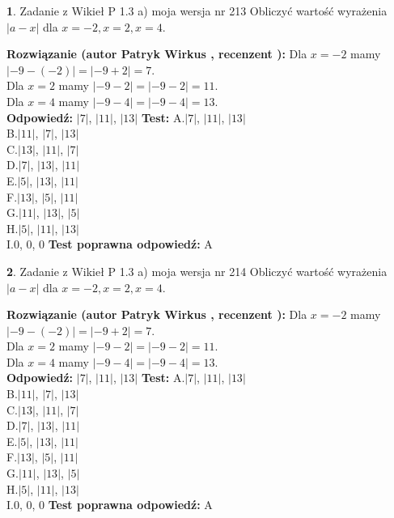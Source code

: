 \documentclass[12pt, a4paper]{article}
\theoremstyle{definition} %
\newtheorem{zad}{}
\newcommand{\zadStart}[1]{\begin{zad}#1\newline}
\newcommand{\zadStop}{\end{zad}}
\newcommand{\rozwStart}[2]{\noindent \textbf{Rozwiązanie (autor #1 , recenzent #2): }\newline}
\newcommand{\rozwStop}{\newline}
\newcommand{\odpStart}{\noindent \textbf{Odpowiedź:}\newline}
\newcommand{\odpStop}{\newline}
\newcommand{\testStart}{\noindent \textbf{Test:}\newline}
\newcommand{\testStop}{\newline}
\newcommand{\kluczStart}{\noindent \textbf{Test poprawna odpowiedź:}\newline}
\newcommand{\kluczStop}{\newline}
\begin{document}
\zadStart{Zadanie z Wikieł P 1.3 a) moja wersja nr 213}
Obliczyć wartość wyrażenia $|a - x|$ dla $x=-2,x=2,x=4$.
\zadStop
\rozwStart{Patryk Wirkus}{}
Dla $x = -2$ mamy $|-9 - (-2)| = |-9 + 2| = 7$.\\
Dla $x = 2$ mamy $|-9 - 2| = |-9 - 2| = 11$.\\
Dla $x = 4$ mamy $|-9 - 4| = |-9 - 4| = 13$.\\
\rozwStop
\odpStart
$|7|$, $|11|$, $|13|$
\odpStop
\testStart
A.$|7|$, $|11|$, $|13|$\\
B.$|11|$, $|7|$, $|13|$\\
C.$|13|$, $|11|$, $|7|$\\
D.$|7|$, $|13|$, $|11|$\\
E.$|5|$, $|13|$, $|11|$\\
F.$|13|$, $|5|$, $|11|$\\
G.$|11|$, $|13|$, $|5|$\\
H.$|5|$, $|11|$, $|13|$\\
I.$0$, $0$, $0$
\testStop
\kluczStart
A
\kluczStop



\zadStart{Zadanie z Wikieł P 1.3 a) moja wersja nr 214}
Obliczyć wartość wyrażenia $|a - x|$ dla $x=-2,x=2,x=4$.
\zadStop
\rozwStart{Patryk Wirkus}{}
Dla $x = -2$ mamy $|-9 - (-2)| = |-9 + 2| = 7$.\\
Dla $x = 2$ mamy $|-9 - 2| = |-9 - 2| = 11$.\\
Dla $x = 4$ mamy $|-9 - 4| = |-9 - 4| = 13$.\\
\rozwStop
\odpStart
$|7|$, $|11|$, $|13|$
\odpStop
\testStart
A.$|7|$, $|11|$, $|13|$\\
B.$|11|$, $|7|$, $|13|$\\
C.$|13|$, $|11|$, $|7|$\\
D.$|7|$, $|13|$, $|11|$\\
E.$|5|$, $|13|$, $|11|$\\
F.$|13|$, $|5|$, $|11|$\\
G.$|11|$, $|13|$, $|5|$\\
H.$|5|$, $|11|$, $|13|$\\
I.$0$, $0$, $0$
\testStop
\kluczStart
A
\kluczStop
\end{document}
